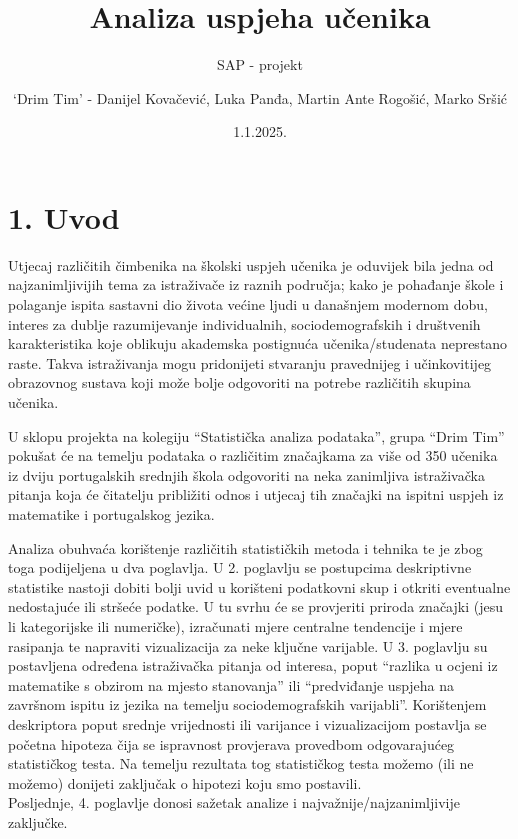 \documentclass[
]{article}
\title{Analiza uspjeha učenika}
\subtitle{SAP - projekt}
\author{`Drim Tim' - Danijel Kovačević, Luka Panđa, Martin Ante Rogošić,
Marko Sršić}
\date{1.1.2025.}
\begin{document}
\maketitle

\hypertarget{uvod}{%
\section{1. Uvod}\label{uvod}}

Utjecaj različitih čimbenika na školski uspjeh učenika je oduvijek bila
jedna od najzanimljivijih tema za istraživače iz raznih područja; kako
je pohađanje škole i polaganje ispita sastavni dio života većine ljudi u
današnjem modernom dobu, interes za dublje razumijevanje individualnih,
sociodemografskih i društvenih karakteristika koje oblikuju akademska
postignuća učenika/studenata neprestano raste. Takva istraživanja mogu
pridonijeti stvaranju pravednijeg i učinkovitijeg obrazovnog sustava
koji može bolje odgovoriti na potrebe različitih skupina učenika.

U sklopu projekta na kolegiju ``Statistička analiza podataka'', grupa
``Drim Tim'' pokušat će na temelju podataka o različitim značajkama za
više od 350 učenika iz dviju portugalskih srednjih škola odgovoriti na
neka zanimljiva istraživačka pitanja koja će čitatelju približiti odnos
i utjecaj tih značajki na ispitni uspjeh iz matematike i portugalskog
jezika.

Analiza obuhvaća korištenje različitih statističkih metoda i tehnika te
je zbog toga podijeljena u dva poglavlja. U 2. poglavlju se postupcima
deskriptivne statistike nastoji dobiti bolji uvid u korišteni podatkovni
skup i otkriti eventualne nedostajuće ili stršeće podatke. U tu svrhu će
se provjeriti priroda značajki (jesu li kategorijske ili numeričke),
izračunati mjere centralne tendencije i mjere rasipanja te napraviti
vizualizacija za neke ključne varijable. U 3. poglavlju su postavljena
određena istraživačka pitanja od interesa, poput ``razlika u ocjeni iz
matematike s obzirom na mjesto stanovanja'' ili ``predviđanje uspjeha na
završnom ispitu iz jezika na temelju sociodemografskih varijabli''.
Korištenjem deskriptora poput srednje vrijednosti ili varijance i
vizualizacijom postavlja se početna hipoteza čija se ispravnost
provjerava provedbom odgovarajućeg statističkog testa. Na temelju
rezultata tog statističkog testa možemo (ili ne možemo) donijeti
zaključak o hipotezi koju smo postavili.\\
Posljednje, 4. poglavlje donosi sažetak analize i
najvažnije/najzanimljivije zaključke.
\end{document}
